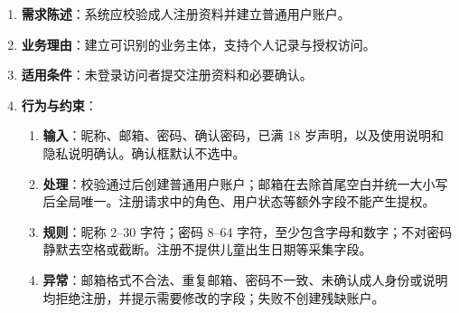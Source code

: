\begin{enumerate}
\item {\bfseries 需求陈述}：系统应校验成人注册资料并建立普通用户账户。
\item {\bfseries 业务理由}：建立可识别的业务主体，支持个人记录与授权访问。
\item {\bfseries 适用条件}：未登录访问者提交注册资料和必要确认。
\item {\bfseries 行为与约束}：
\begin{enumerate}
\item {\bfseries 输入}：昵称、邮箱、密码、确认密码，已满 18 岁声明，以及使用说明和隐私说明确认。确认框默认不选中。
\item {\bfseries 处理}：校验通过后创建普通用户账户；邮箱在去除首尾空白并统一大小写后全局唯一。注册请求中的角色、用户状态等额外字段不能产生提权。
\item {\bfseries 规则}：昵称 2--30 字符；密码 8--64 字符，至少包含字母和数字；不对密码静默去空格或截断。注册不提供儿童出生日期等采集字段。
\item {\bfseries 异常}：邮箱格式不合法、重复邮箱、密码不一致、未确认成人身份或说明均拒绝注册，并提示需要修改的字段；失败不创建残缺账户。
\end{enumerate}

\end{enumerate}


